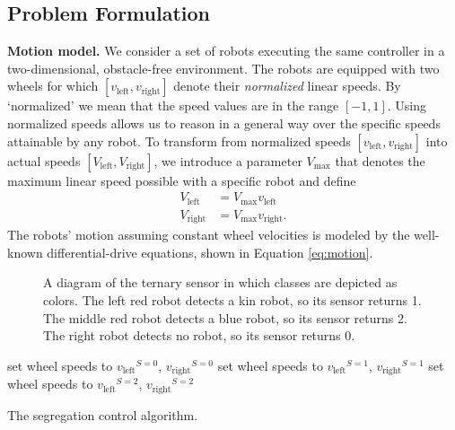 \documentclass[letterpaper, 10 pt, conference]{ieeeconf}
\newcommand{\myparagraph}[1]{\textbf{#1.}}
\begin{document}
\subsection{Problem Formulation}

\newcommand{\vL}{\ensuremath{v_{\text{left}}}}
\newcommand{\vR}{\ensuremath{v_{\text{right}}}}
\newcommand{\vaL}{\ensuremath{V_{\text{left}}}}
\newcommand{\vaR}{\ensuremath{V_{\text{right}}}}
\newcommand{\VM}{\ensuremath{V_{\text{max}}}}
\myparagraph{Motion model}
We consider a set of robots executing the same controller in a two-dimensional,
obstacle-free environment. The robots are equipped with two wheels for which
$[\vL,\vR]$ denote their \emph{normalized} linear speeds. By `normalized' we
mean that the speed values are in the range $[-1, 1]$. Using normalized speeds
allows us to reason in a general way over the specific speeds attainable by any
robot. To transform from normalized speeds $[\vL,\vR]$ into actual speeds
$[\vaL,\vaR]$, we introduce a parameter $\VM$ that denotes the maximum linear
speed possible with a specific robot and define
\begin{align}
  \vaL &= \VM \vL\\
  \vaR &= \VM \vR.
\end{align}
The robots' motion assuming constant wheel velocities is modeled by the well-known differential-drive
equations, shown in Equation \eqref{eq:motion}.

\newcommand{\vPN}[2]{\ensuremath{v_{\text{#1}}}^{S=#2}}
\newcommand{\robot}[2]{%
  \filldraw[draw=#2,fill=#2!20] (#1) circle(5mm);
  \draw[draw=#2,->,-Stealth,rotate around={0:(#1)}] (#1) -- +(5mm,0);
  \fill[fill=gray!20] ($(#1)+(5mm,0)$) -- +( 45:1cm) -- +(-45:1cm) -- cycle;%
  \fill[fill=#2] ($(#1)+(5mm,0)$) circle (1mm);%
}
\begin{figure}[t]
  \centering
  \caption{A diagram of the ternary sensor in which classes are depicted
    as colors. The left red robot detects a kin robot, so its sensor
    returns 1. The middle red robot detects a blue robot, so its sensor
    returns 2. The right robot detects no robot, so its sensor returns
    0.}
  \label{fig:sensor}
\end{figure}
\begin{algorithm}[t]
  \begin{algorithmic}
     \State set wheel speeds to $\vPN{left}{0}$, $\vPN{right}{0}$
     \State set wheel speeds to $\vPN{left}{1}$, $\vPN{right}{1}$
    \Else \State set wheel speeds to $\vPN{left}{2}$, $\vPN{right}{2}$
    \EndIf
  \end{algorithmic}
  \caption{The segregation control algorithm.}
  \label{alg:controller}
\end{algorithm}
\end{document}
